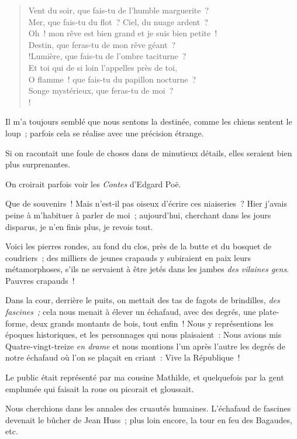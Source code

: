\documentclass[french,twoside]{book} %
\begin{document}
\begin{verse}
Vent du soir, que fais-tu de l’humble marguerite ?\\
Mer, que fais-tu du flot ? Ciel, du nuage ardent ?\\
Oh ! mon rêve est bien grand et je suis bien petite !\\
Destin, que feras-tu de mon rêve géant ?\\!Lumière, que fais-tu de l’ombre taciturne ?\\
Et toi qui de si loin l’appelles près de toi,\\
O flamme ! que fais-tu du papillon nocturne ?\\
Songe mystérieux, que feras-tu de moi ?\\!
\end{verse}

 \noindent Il m’a toujours semblé que nous sentons la destinée, comme les chiens sentent le loup ; parfois cela se réalise avec une précision étrange.\par
Si on racontait une foule de choses dans de minutieux détails, elles seraient bien plus surprenantes.\par
On croirait parfois voir les \emph{Contes} d’Edgard Poë.\par
\bigbreak
\noindent Que de souvenirs ! Mais n’est-il pas oiseux d’écrire ces niaiseries ? Hier j’avais peine à m’habituer à parler de moi ; aujourd’hui, cherchant dans les jours disparus, je n’en finis plus, je revois tout.\par
Voici les pierres rondes, au fond du clos, près de la butte et du bosquet de coudriers ; des milliers de jeunes crapauds y subiraient en paix leurs métamorphoses, s’ils ne servaient à être jetés dans les jambes \emph{des vilaines gens}. Pauvres crapauds !\par
Dans la cour, derrière le puits, on mettait des tas de fagots de brindilles, \emph{des fascines ;} cela nous menait à élever un échafaud, avec des degrés, une plate-forme, deux grands montants de bois, tout enfin ! Nous y représentions les époques historiques, et les personnages qui nous plaisaient :  Nous avions mis Quatre-vingt-treize \emph{en drame} et nous montions l’un après l’autre les degrés de notre échafaud où l’on se plaçait en criant : Vive la République !\par
Le public était représenté par ma cousine Mathilde, et quelquefois par la gent emplumée qui faisait la roue ou picorait et gloussait.\par
Nous cherchions dans les annales des cruautés humaines. L’échafaud de fascines devenait le bûcher de Jean Huss ; plus loin encore, la tour en feu des Bagaudes, etc.\par
\end{document}
